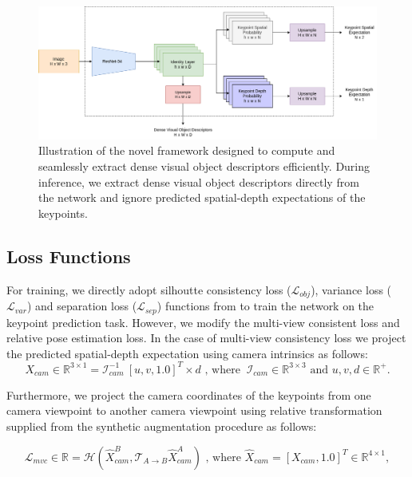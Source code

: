 \begin{figure}[htb]
    \centering
    \includegraphics[scale=0.34]{images/arch.png}
    \caption{Illustration of the novel framework designed to compute and seamlessly extract dense visual object descriptors efficiently.
        During inference, we extract dense visual object descriptors directly from the network and ignore predicted spatial-depth expectations of the keypoints.}
    \label{fig:modified_dnn}
\end{figure}


\subsection{Loss Functions}

For training, we directly adopt silhoutte consistency loss ($\mathcal{L}_{obj}$), variance loss ($\mathcal{L}_{var}$) and separation loss ($\mathcal{L}_{sep}$) functions from \cite{suwajanakorn2018discovery} to train the network on the keypoint prediction task.
However, we modify the multi-view consistent loss and relative pose estimation loss. In the case of multi-view consistency loss we
project the predicted spatial-depth expectation using camera intrinsics as follows:
\begin{equation}
    X_{cam} \in \mathbb{R}^{3 \times 1} = \mathcal{I}_{cam}^{-1}  \ [u, v, 1.0]^T \times d \text{ , where  } \ \mathcal{I}_{cam} \in \mathbb{R}^{3 \times 3} \text{ and }  u, v, d \in \mathbb{R}^+.
\end{equation}

Furthermore, we project the camera coordinates of the keypoints from one camera viewpoint to another camera viewpoint using relative transformation supplied from the synthetic augmentation procedure as follows:

\begin{equation}
    \label{eqn:mvc}
    \mathcal{L}_{mvc} \in \mathbb{R} = \mathcal{H}(\hat{X}^B_{cam}, \mathcal{T}_{A \rightarrow B} \hat{X}^A_{cam}) \text{ , where  } \hat{X}_{cam}=[X_{cam}, 1.0]^T \in \mathbb{R}^{4 \times 1} ,
\end{equation}


